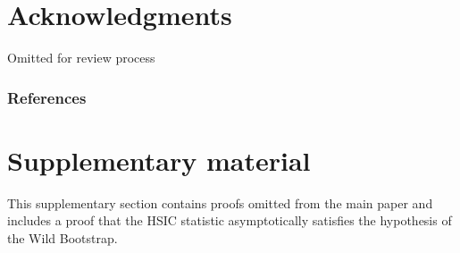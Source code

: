 \documentclass[]{article}
\begin{document}
%
%
%



\section*{Acknowledgments} 
Omitted for review process

\subsubsection*{References}




\appendix
\onecolumn

\section{Supplementary material}
This supplementary section contains proofs omitted from the main paper and includes a proof that the HSIC statistic asymptotically satisfies the hypothesis of the Wild Bootstrap.
\end{document}
